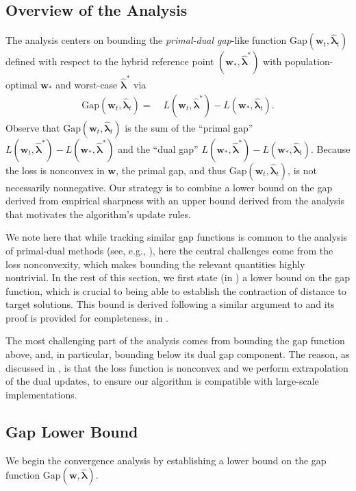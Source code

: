 \documentclass[11pt]{article}
\newcounter{thm}
\numberwithin{thm}{section}
\theoremstyle{plain}
\theoremstyle{definition}
\theoremstyle{remark} \newtheorem{remark}[thm]{Remark}
\def\vlambda{{\bm{\lambda}}}
\def\vw{{\bm{w}}}
\newcommand{\Gap}{\mathrm{Gap}}
\newcommand{\evlambda}{\widehat{\vlambda}}
\begin{document}
\subsection{Overview of the Analysis}

The analysis centers on bounding the \emph{primal-dual gap}-like function  \(\Gap(\vw_t,\evlambda_t)\) defined with respect to the hybrid reference point $(\vw_*, \evlambda^*)$ with population-optimal $\vw_*$ and worst-case $\evlambda^*$ via
\begin{align*}
\Gap(\vw_t,\evlambda_t) =\;& L(\vw_t,\evlambda^*) - L(\vw_*,\evlambda_t). 
\end{align*}
Observe that $\Gap(\vw_t,\evlambda_t)$ is the sum of the ``primal gap'' $L(\vw_t,\evlambda^*) - L(\vw_*,\evlambda^*)$ and the ``dual gap'' $L(\vw_*,\evlambda^*) - L(\vw_*,\evlambda_t)$. 
Because the loss is nonconvex in $\vw$, the primal gap, and thus $\Gap(\vw_t,\evlambda_t)$, is not necessarily nonnegative. Our strategy is to combine a lower bound on the gap derived from empirical sharpness with an upper bound derived from the analysis that motivates the algorithm's update rules. 

We note here that while tracking similar gap functions is common to the analysis of primal-dual methods (see, e.g., \citep{chambolle2011first,mehta2025min}), here the central challenges come from the loss nonconvexity, which makes bounding the relevant quantities highly nontrivial. In the rest of this section, we first state (in ) a lower bound on the gap function, which is crucial to being able to establish the contraction of distance to target solutions. This bound is derived following a similar argument to \citep{Li2024shifts} and its proof is provided for completeness, in . 

The most challenging part of the analysis comes from bounding the gap function above, and, in particular, bounding below its dual gap component. The reason, as discussed in , is that the loss function is nonconvex and we perform extrapolation of the dual updates, to ensure our algorithm is compatible with large-scale implementations. 


\subsection{Gap Lower Bound} 

We begin the convergence analysis by establishing a lower bound on the gap function \(\Gap(\vw, \evlambda)\). 
\end{document}
